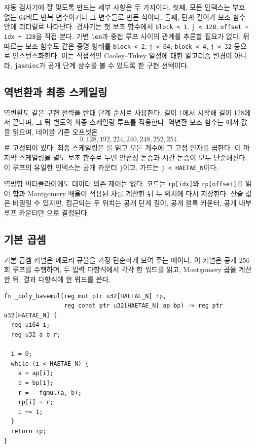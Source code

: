 \documentclass[10pt,twocolumn]{article}
\begin{document}
자동 검사기에 잘 맞도록 만드는 세부 사항은 두 가지이다. 첫째, 모든
인덱스는 부호 없는 64비트 반복 변수이거나 그 변수들로 만든 식이다.
둘째, 단계 길이가 보조 함수 안에 리터럴로 나타난다. 검사기는 첫
보조 함수에서 \texttt{block < 1}, \texttt{j < 128},
\texttt{offset = idx + 128}을 직접 본다. 가변 \texttt{len}과 중첩 루프
사이의 관계를 추론할 필요가 없다. 뒤따르는 보조 함수도 같은 증명
형태를 \texttt{block < 2}, \texttt{j < 64};
\texttt{block < 4}, \texttt{j < 32} 등으로 인스턴스화한다. 이는
직접적인 Cooley--Tukey 일정에 대한 알고리즘 변경이 아니라,
\texttt{jasminc}가 공개 단계 상수를 볼 수 있도록 한 구현 선택이다.

\subsection{역변환과 최종 스케일링}

역변환도 같은 구현 전략을 반대 단계 순서로 사용한다. 길이 1에서
시작해 길이 128에서 끝나며, 그 뒤 별도의 최종 스케일링 루프를
적용한다. 역변환 보조 함수는 에서 값을 읽으며,
테이블 기준 오프셋은
\[
  0,128,192,224,240,248,252,254
\]
로 고정되어 있다. 최종 스케일링은 를 읽고 모든
계수에 그 고정 인자를 곱한다. 이 마지막 스케일링을 별도 보조 함수로
두면 안전성 논증과 시간 논증이 모두 단순해진다. 이 루프의 유일한
인덱스는 공개 카운터 \texttt{j}이고, 가드는
\texttt{j < HAETAE\_N}이다.

역방향 버터플라이에도 데이터 의존 제어는 없다. 코드는 \texttt{rp[idx]}와
\texttt{rp[offset]}를 읽어 합과 Montgomery 배율이 적용된 차를 계산한
뒤 두 위치에 다시 저장한다. 산술 값은 비밀일 수 있지만, 접근되는
두 위치는 공개 단계 길이, 공개 블록 카운터, 공개 내부 루프 카운터만
으로 결정된다.

\subsection{기본 곱셈}

기본 곱셈 커널은 메모리 규율을 가장 단순하게 보여 주는 예이다. 이
커널은 공개 256회 루프를 수행하며, 두 입력 다항식에서 각각 한 워드를
읽고, Montgomery 곱을 계산한 뒤, 결과 다항식에 한 워드를 쓴다.

\begin{lstlisting}[caption={\texttt{poly.jinc}의 기본 곱셈.},label={lst:basemul}]
fn _poly_basemul(reg mut ptr u32[HAETAE_N] rp,
                 reg const ptr u32[HAETAE_N] ap bp) -> reg ptr u32[HAETAE_N] {
  reg ui64 i;
  reg u32 a b r;

  i = 0;
  while (i < HAETAE_N) {
    a = ap[i];
    b = bp[i];
    r = __fqmul(a, b);
    rp[i] = r;
    i += 1;
  }
  return rp;
}
\end{lstlisting}
\end{document}
